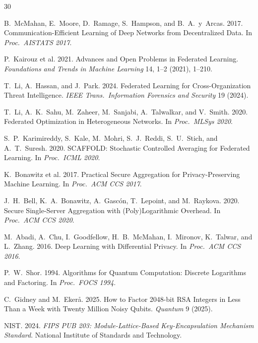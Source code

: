 \documentclass[sigconf,nonacm]{acmart}
\begin{document}
\sloppy

\begin{thebibliography}{30}

B.~McMahan, E.~Moore, D.~Ramage, S.~Hampson, and B.~A.~y~Arcas. 2017.
Communication-Efficient Learning of Deep Networks from Decentralized
Data. In \textit{Proc.\ AISTATS 2017}.

P.~Kairouz et al. 2021. Advances and Open Problems in Federated
Learning. \textit{Foundations and Trends in Machine Learning} 14, 1--2
(2021), 1--210.

T.~Li, A.~Hassan, and J.~Park. 2024. Federated Learning for
Cross-Organization Threat Intelligence. \textit{IEEE Trans.\
Information Forensics and Security} 19 (2024).

T.~Li, A.~K.~Sahu, M.~Zaheer, M.~Sanjabi, A.~Talwalkar, and V.~Smith.
2020. Federated Optimization in Heterogeneous Networks.
In \textit{Proc.\ MLSys 2020}.

S.~P.~Karimireddy, S.~Kale, M.~Mohri, S.~J.~Reddi, S.~U.~Stich, and
A.~T.~Suresh. 2020. SCAFFOLD: Stochastic Controlled Averaging for
Federated Learning. In \textit{Proc.\ ICML 2020}.

K.~Bonawitz et al. 2017. Practical Secure Aggregation for
Privacy-Preserving Machine Learning. In \textit{Proc.\ ACM CCS 2017}.

J.~H.~Bell, K.~A.~Bonawitz, A.~Gasc\'on, T.~Lepoint, and M.~Raykova.
2020. Secure Single-Server Aggregation with (Poly)Logarithmic
Overhead. In \textit{Proc.\ ACM CCS 2020}.

M.~Abadi, A.~Chu, I.~Goodfellow, H.~B.~McMahan, I.~Mironov, K.~Talwar,
and L.~Zhang. 2016. Deep Learning with Differential Privacy.
In \textit{Proc.\ ACM CCS 2016}.

P.~W.~Shor. 1994. Algorithms for Quantum Computation: Discrete
Logarithms and Factoring. In \textit{Proc.\ FOCS 1994}.

C.~Gidney and M.~Eker\aa{}. 2025. How to Factor 2048-bit RSA
Integers in Less Than a Week with Twenty Million Noisy Qubits.
\textit{Quantum} 9 (2025).

NIST. 2024. \textit{FIPS PUB 203: Module-Lattice-Based Key-Encapsulation
Mechanism Standard}. National Institute of Standards and Technology.


\end{thebibliography}
\end{document}
